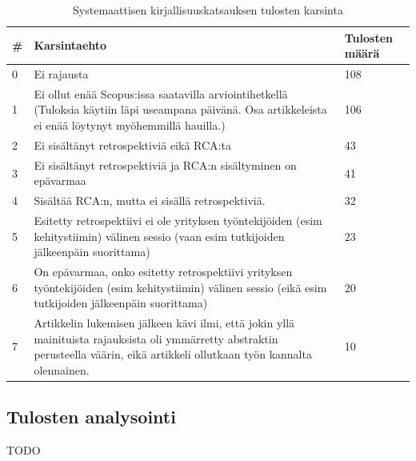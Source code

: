 \begin{table}
    \begin{tabular}{|p{0.5cm}|p{11.5cm}|p{2cm}|}
        \hline
        \textbf{\#} & \textbf{Karsintaehto} & \textbf{Tulosten määrä} \\ \hline
        0 & Ei rajausta                                                                                                                                               & 108            \\ \hline
        1 & Ei ollut enää Scopus:issa saatavilla arviointihetkellä (Tuloksia käytiin läpi useampana päivänä. Osa artikkeleista ei enää löytynyt myöhemmillä hauilla.) & 106            \\ \hline
        2 & Ei sisältänyt retrospektiviä eikä RCA:ta                                                                                                                          & 43             \\ \hline
        3 & Ei sisältänyt retrospektiviä ja RCA:n sisältyminen on epävarmaa                                                                                                   & 41             \\ \hline
        4 & Sisältää RCA:n, mutta ei sisällä retrospektiviä.                                                                                                                  & 32             \\ \hline
        5 & Esitetty retrospektiivi ei ole yrityksen työntekijöiden (esim kehitystiimin) välinen sessio (vaan esim tutkijoiden jälkeenpäin suorittama)                & 23             \\ \hline
        6 & On epävarmaa, onko esitetty retrospektiivi yrityksen työntekijöiden (esim kehitystiimin) välinen sessio (eikä esim tutkijoiden jälkeenpäin suorittama)    & 20             \\
        \hline
        7 & Artikkelin lukemisen jälkeen kävi ilmi, että jokin yllä mainituista rajauksista oli ymmärretty abstraktin perusteella väärin, eikä artikkeli ollutkaan työn kannalta olennainen. & 10 \\ \hline
    \end{tabular}
    \caption{Systemaattisen kirjallisuuskatsauksen tulosten karsinta}
    \label{tab:karsintaehdot_taulukko}
\end{table}

\subsection{Tulosten analysointi}
TODO

